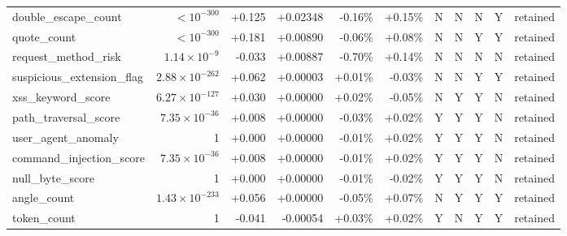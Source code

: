 \begin{table}[t]
\begin{tabular}{lrrrrrccccr}
double\_escape\_count & $<10^{-300}$ & +0.125 & +0.02348 & -0.16\% & +0.15\% & N & N & N & Y & retained \\
quote\_count & $<10^{-300}$ & +0.181 & +0.00890 & -0.06\% & +0.08\% & N & N & Y & Y & retained \\
request\_method\_risk & $1.14\times10^{-9}$ & -0.033 & +0.00887 & -0.70\% & +0.14\% & N & N & N & N & retained \\
suspicious\_extension\_flag & $2.88\times10^{-262}$ & +0.062 & +0.00003 & +0.01\% & -0.03\% & N & N & Y & Y & retained \\
xss\_keyword\_score & $6.27\times10^{-127}$ & +0.030 & +0.00000 & +0.02\% & -0.05\% & N & Y & Y & N & retained \\
path\_traversal\_score & $7.35\times10^{-36}$ & +0.008 & +0.00000 & -0.03\% & +0.02\% & Y & Y & Y & N & retained \\
user\_agent\_anomaly & 1 & +0.000 & +0.00000 & -0.01\% & +0.02\% & Y & Y & Y & N & retained \\
command\_injection\_score & $7.35\times10^{-36}$ & +0.008 & +0.00000 & -0.01\% & +0.02\% & Y & Y & Y & N & retained \\
null\_byte\_score & 1 & +0.000 & +0.00000 & -0.01\% & -0.02\% & Y & Y & Y & N & retained \\
angle\_count & $1.43\times10^{-233}$ & +0.056 & +0.00000 & -0.05\% & +0.07\% & N & Y & Y & Y & retained \\
token\_count & 1 & -0.041 & -0.00054 & +0.03\% & +0.02\% & Y & N & Y & Y & retained \\
\bottomrule
\end{tabular}
\end{table}
